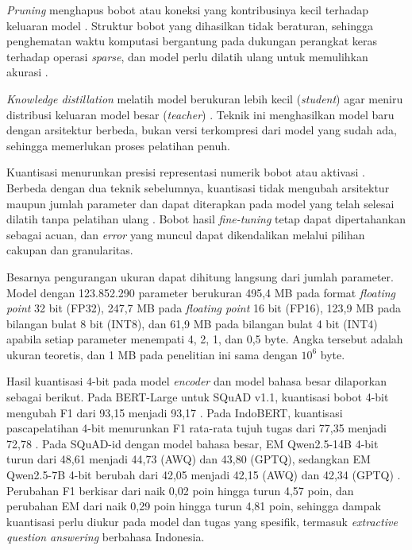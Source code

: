 \textit{Pruning} menghapus bobot atau koneksi yang kontribusinya kecil terhadap keluaran model \parencite{han2016deep}. Struktur bobot yang dihasilkan tidak beraturan, sehingga penghematan waktu komputasi bergantung pada dukungan perangkat keras terhadap operasi \textit{sparse}, dan model perlu dilatih ulang untuk memulihkan akurasi \parencite{han2016deep}.

\textit{Knowledge distillation} melatih model berukuran lebih kecil (\textit{student}) agar meniru distribusi keluaran model besar (\textit{teacher}) \parencite{hinton2015distilling}. Teknik ini menghasilkan model baru dengan arsitektur berbeda, bukan versi terkompresi dari model yang sudah ada, sehingga memerlukan proses pelatihan penuh.

Kuantisasi menurunkan presisi representasi numerik bobot atau aktivasi \parencite{gholami2021survey}. Berbeda dengan dua teknik sebelumnya, kuantisasi tidak mengubah arsitektur maupun jumlah parameter dan dapat diterapkan pada model yang telah selesai dilatih tanpa pelatihan ulang \parencite{gholami2021survey}. Bobot hasil \textit{fine-tuning} tetap dapat dipertahankan sebagai acuan, dan \textit{error} yang muncul dapat dikendalikan melalui pilihan cakupan dan granularitas.

Besarnya pengurangan ukuran dapat dihitung langsung dari jumlah parameter. Model dengan 123.852.290 parameter berukuran 495,4 MB pada format \textit{floating point} 32 bit (FP32), 247,7 MB pada \textit{floating point} 16 bit (FP16), 123,9 MB pada bilangan bulat 8 bit (INT8), dan 61,9 MB pada bilangan bulat 4 bit (INT4) apabila setiap parameter menempati 4, 2, 1, dan 0,5 byte. Angka tersebut adalah ukuran teoretis, dan 1 MB pada penelitian ini sama dengan $10^{6}$ byte.

Hasil kuantisasi 4-bit pada model \textit{encoder} dan model bahasa besar dilaporkan sebagai berikut. Pada BERT-Large untuk SQuAD v1.1, kuantisasi bobot 4-bit mengubah F1 dari 93,15 menjadi 93,17 \parencite{zadeh2022mokey}. Pada IndoBERT, kuantisasi pascapelatihan 4-bit menurunkan F1 rata-rata tujuh tugas dari 77,35 menjadi 72,78 \parencite{abdurrahman2023implementing}. Pada SQuAD-id dengan model bahasa besar, EM Qwen2.5-14B 4-bit turun dari 48,61 menjadi 44,73 (AWQ) dan 43,80 (GPTQ), sedangkan EM Qwen2.5-7B 4-bit berubah dari 42,05 menjadi 42,15 (AWQ) dan 42,34 (GPTQ) \parencite{ramaputra2026evaluating}. Perubahan F1 berkisar dari naik 0,02 poin hingga turun 4,57 poin, dan perubahan EM dari naik 0,29 poin hingga turun 4,81 poin, sehingga dampak kuantisasi perlu diukur pada model dan tugas yang spesifik, termasuk \textit{extractive question answering} berbahasa Indonesia.

